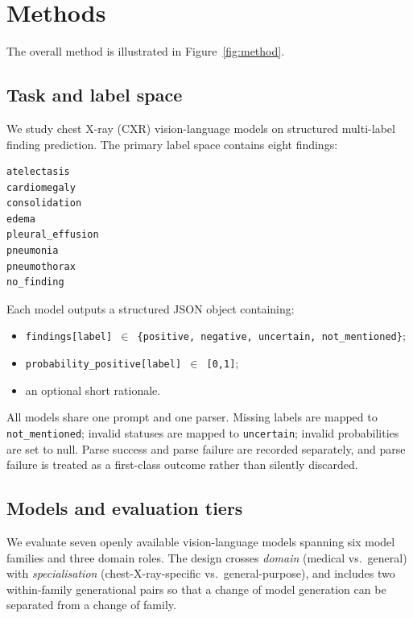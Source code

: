 \section{Methods}

The overall method is illustrated in Figure~\ref{fig:method}.

\subsection{Task and label space}

We study chest X-ray (CXR) vision-language models on structured multi-label finding prediction. The primary label space contains eight findings:

\begin{verbatim}
atelectasis
cardiomegaly
consolidation
edema
pleural_effusion
pneumonia
pneumothorax
no_finding
\end{verbatim}

Each model outputs a structured JSON object containing:

\begin{itemize}
\item \texttt{findings[label] $\in$ \{positive, negative, uncertain, not\_mentioned\}};
\item \texttt{probability\_positive[label] $\in$ [0,1]};
\item an optional short rationale.
\end{itemize}

All models share one prompt and one parser. Missing labels are mapped to \texttt{not\_mentioned}; invalid statuses are mapped to \texttt{uncertain}; invalid probabilities are set to null. Parse success and parse failure are recorded separately, and parse failure is treated as a first-class outcome rather than silently discarded.

\subsection{Models and evaluation tiers}

We evaluate seven openly available vision-language models spanning six model
families and three domain roles. The design crosses \emph{domain}
(medical vs.\ general) with \emph{specialisation} (chest-X-ray-specific vs.\
general-purpose), and includes two within-family generational pairs so that a
change of model generation can be separated from a change of family.

